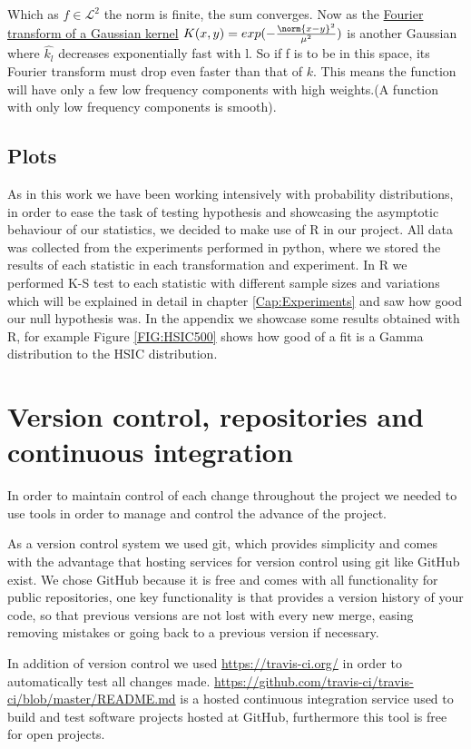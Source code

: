 Which as $f\in\mathcal{L}^{2}$ the norm is finite, the sum converges. Now as the  \href{http://mathworld.wolfram.com/FourierTransformGaussian.html}{Fourier transform of a Gaussian kernel}  $K(x,y) = exp(-\frac{\norm{x-y}^{2}}{\mu^{2}})$ is another Gaussian where $\hat{k_{l}}$ decreases exponentially fast with l. So if f is to be in this space, its Fourier transform must drop even faster than that of $k$. This means the function will have only a few low frequency components with high weights.(A function with only low frequency components is smooth). 


\label{Plots}\subsection{Plots} 

As in this work we have been working intensively with probability distributions, in order to ease the task of testing hypothesis and showcasing the asymptotic behaviour of our statistics, we decided to make use of R in our project. All data was collected from the experiments performed in python, where we stored the results of each statistic in each transformation and experiment.
In R we performed K-S test to each statistic with different sample sizes and variations which will be explained in detail in chapter \ref{Cap:Experiments} and saw how good our null hypothesis was. In the appendix we showcase some results obtained with R, for example Figure \ref{FIG:HSIC500} shows how good of a fit is a Gamma distribution to the HSIC distribution.

\section{Version control, repositories and continuous integration}

In order to maintain control of each change throughout the project we needed to use tools in order to manage and control the advance of the project.

As a version control system we used git, which provides simplicity and comes with the advantage that hosting services for version control using git like GitHub exist. We chose GitHub because it is free and comes with all functionality for public repositories, one key functionality is that provides a version history of your code, so that previous versions are not lost with every new merge, easing removing mistakes or going back to a previous version if necessary. 

In addition of version control we used \href{Travis-CI}{https://travis-ci.org/} in order to automatically test all changes made. \href{Travis CI}{https://github.com/travis-ci/travis-ci/blob/master/README.md} is a hosted continuous integration service used to build and test software projects hosted at GitHub, furthermore this tool is free for open projects.

